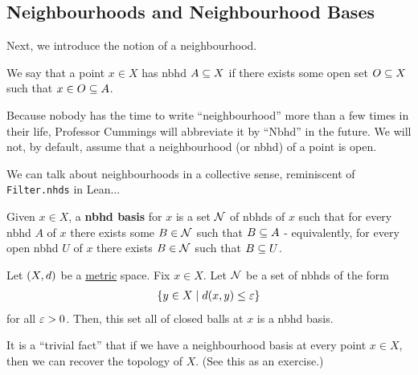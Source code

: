 \subsection{Neighbourhoods and Neighbourhood Bases}

Next, we introduce the notion of a neighbourhood.

\begin{boxdefinition}[Nbhd]%
    We say that a point $x\in X$ has nbhd $A\subseteq X$ if there exists some open set $O\subseteq X$ such that $x\in O \subseteq A$.
\end{boxdefinition}

\begin{boxabbrev} 
    Because nobody has the time to write ``neighbourhood'' more than a few times in their life, Professor Cummings will abbreviate it by ``Nbhd'' in the future. We will not, by default, assume that a neighbourhood (or nbhd) of a point is open.
\end{boxabbrev}

We can talk about neighbourhoods in a collective sense, reminiscent of \verb|Filter.nhds| in Lean...

\begin{boxdefinition}
    Given $x\in X$, a \textbf{nbhd basis} for $x$ is a set $\mathcal{N}$ of nbhds of $x$ such that for every nbhd $A$ of $x$ there exists some $B \in \mathcal{N}$ such that $B\subseteq A$ - equivalently, for every open nbhd $U$ of $x$ there exists $B\in \mathcal{N}$ such that $B\subseteq U$.
\end{boxdefinition}%


\begin{boxexample}
    Let $\left( X, d \right)$ be a \underline{metric} space. Fix $x \in X$. Let $\mathcal{N}$ be a set of nbhds of the form
    \begin{align*}
        \left\{ y \in X \; \middle\vert \; d\!\left( x, y \right) \leq \varepsilon \right\}
    \end{align*}
    for all $\varepsilon > 0$. Then, this set all of closed balls at $x$ is a nbhd basis. %
\end{boxexample}%
\begin{remark}
    It is a ``trivial fact'' that if we have a neighbourhood basis at every point $x\in X$, then we can recover the topology of $X$. (See this as an exercise.)
\end{remark}

